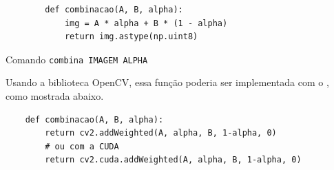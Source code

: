 \begin{listing}[H]
    \begin{verbatim}
        def combinacao(A, B, alpha):
            img = A * alpha + B * (1 - alpha)
            return img.astype(np.uint8)
    \end{verbatim}

    \caption{Comando \texttt{combina IMAGEM ALPHA}}
\end{listing}

Usando a biblioteca OpenCV, essa função poderia ser implementada com o  \autocite{ref:addweighted}, como mostrada abaixo.

\begin{verbatim}
    def combinacao(A, B, alpha):
        return cv2.addWeighted(A, alpha, B, 1-alpha, 0)
        # ou com a CUDA
        return cv2.cuda.addWeighted(A, alpha, B, 1-alpha, 0)
\end{verbatim}
